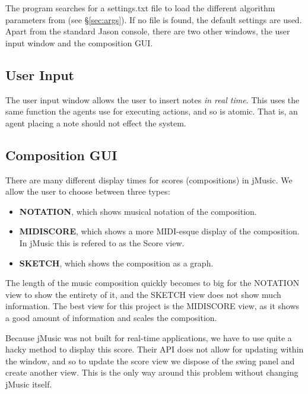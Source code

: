 \documentclass[12pt]{article}
\begin{document}
	The program searches for a settings.txt file to load the different algorithm parameters from (see \S\ref{sec:args}). If no file is found, the default settings are used. Apart from the standard Jason console, there are two other windows, the user input window and the composition GUI.
	
	\subsection{User Input}
	The user input window allows the user to insert notes {\it in real time}. This uses the same function the agents use for executing actions, and so is atomic. That is, an agent placing a note should not effect the system.
	
	\subsection{Composition GUI}
	There are many different display times for scores (compositions) in jMusic. We allow the user to choose between three types:
	\begin{itemize}
		\item {\bf NOTATION}, which shows musical notation of the composition.
		\item {\bf MIDISCORE}, which shows a more MIDI-esque display of the composition. In jMusic this is refered to as the Score view.
		\item {\bf SKETCH}, which shows the composition as a graph.
	\end{itemize}
	The length of the music composition quickly becomes to big for the NOTATION view to show the entirety of it, and the SKETCH view does not show much information. The best view for this project is the MIDISCORE view, as it shows a good amount of information and scales the composition.
	
	Because jMusic was not built for real-time applications, we have to use quite a hacky method to display this score. Their API does not allow for updating within the window, and so to update the score view we dispose of the swing panel and create another view. This is the only way around this problem without changing jMusic itself.
	
	
\end{document}
